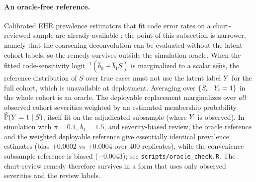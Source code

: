 \paragraph{An oracle-free reference.}
\label{par:oracle-free}
Calibrated EHR prevalence
estimators that fit code error rates on a chart-reviewed sample are
already available \citep{tong2020augmented,beesley2022samba,zhang2019phiap};
the point of this subsection is narrower, namely that the coarsening
deconvolution can be evaluated without the latent cohort labels, so the
remedy survives outside the simulation oracle. When the fitted
code-sensitivity $\mathrm{logit}^{-1}(\hat b_0 + \hat b_1 S)$ is
marginalized to a scalar $\widehat{\mathrm{sens}}$, the reference
distribution of $S$ over true cases must not use the latent label
$Y$ for the full cohort, which is unavailable at deployment.
Averaging over $\{S_i : Y_i = 1\}$ in the whole cohort is an oracle.
The deployable replacement marginalizes over \emph{all} observed
cohort severities weighted by an estimated membership probability
$\widehat{\mathbb{P}}(Y = 1 \mid S)$, itself fit on the adjudicated
subsample (where $Y$ is observed). In simulation with $\pi = 0.1$,
$b_1 = 1.5$, and severity-biased review, the oracle reference and the
weighted deployable reference give essentially identical prevalence
estimates (bias $+0.0002$ vs $+0.0004$ over $400$ replicates), while
the convenience subsample reference is biased ($-0.0043$); see
\texttt{scripts/oracle\_check.R}. The chart-review remedy therefore
survives in a form that uses only observed severities and the review
labels.

